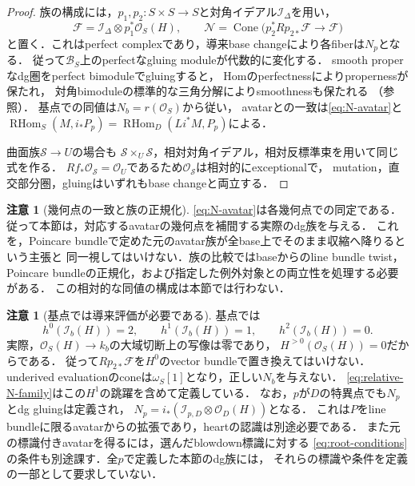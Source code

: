 \documentclass[11pt,a4paper]{ltjsarticle}
\theoremstyle{definition}
\newtheorem{remark}[theorem]{注意}
\newcommand{\OO}{\mathcal O}
\newcommand{\BB}{\mathcal B}
\newcommand{\RHom}{\operatorname{RHom}}
\begin{document}
\begin{proof}
族の構成には，$p_1,p_2:S\times S\to S$と対角イデアル$\mathcal I_\Delta$を用い，
\begin{equation}\label{eq:relative-N-family}
 \mathcal F=\mathcal I_\Delta\otimes p_1^*\OO_S(H),\qquad
 \mathcal N=\operatorname{Cone}
 \bigl(p_2^*Rp_{2*}\mathcal F\longrightarrow\mathcal F\bigr)
\end{equation}
と置く．これはperfect complexであり，導来base changeにより各fiberは$N_p$となる．
従って$\BB_S$上のperfectなgluing moduleが代数的に変化する．
smooth properなdg圏をperfect bimoduleでgluingすると，
Homのperfectnessによりpropernessが保たれ，
対角bimoduleの標準的な三角分解によりsmoothnessも保たれる
（\cite[Proposition~3.22, Theorem~3.25]{OrlovGluing}参照）．
基点での同値は$N_b=r(\OO_S)$から従い，
avatarとの一致は\eqref{eq:N-avatar}と
$\RHom_S(M,i_*P_p)=\RHom_D(Li^*M,P_p)$による．

曲面族$\mathcal S\to U$の場合も
$\mathcal S\times_U\mathcal S$，相対対角イデアル，相対反標準束を用いて同じ式を作る．
$R f_*\OO_{\mathcal S}=\OO_U$であるため$\OO_{\mathcal S}$は相対的にexceptionalで，
mutation，直交部分圏，gluingはいずれもbase changeと両立する．
\end{proof}

\begin{remark}[幾何点の一致と族の正規化]
\eqref{eq:N-avatar}は各幾何点での同定である．
従って本節は，対応するavatarの幾何点を補間する実際のdg族を与える．
これを，Poincare bundleで定めた元のavatar族が全base上でそのまま収縮へ降りるという主張と
同一視してはいけない．族の比較ではbaseからのline bundle twist，
Poincare bundleの正規化，および指定した例外対象との両立性を処理する必要がある．
この相対的な同値の構成は本節では行わない．
\end{remark}

\begin{remark}[基点では導来評価が必要である]\label{rem:derived-evaluation-b}
基点では
\[
 h^0(\mathcal I_b(H))=2,\qquad h^1(\mathcal I_b(H))=1,
 \qquad h^2(\mathcal I_b(H))=0.
\]
実際，$\OO_S(H)\to k_b$の大域切断上の写像は零であり，
$H^{>0}(\OO_S(H))=0$だからである．
従って$Rp_{2*}\mathcal F$を$H^0$のvector bundleで置き換えてはいけない．
underived evaluationのconeは$\omega_S[1]$となり，正しい$N_b$を与えない．
\eqref{eq:relative-N-family}はこの$H^1$の跳躍を含めて定義している．
なお，$p$が$D$の特異点でも$N_p$とdg gluingは定義され，
$N_p=i_*(\mathcal I_{p,D}\otimes\OO_D(H))$となる．
これは$P$をline bundleに限るavatarからの拡張であり，heartの認識は別途必要である．
また元の標識付きavatarを得るには，選んだblowdown標識に対する
\eqref{eq:root-conditions}の条件も別途課す．全$p$で定義した本節のdg族には，
それらの標識や条件を定義の一部として要求していない．
\end{remark}
\end{document}
